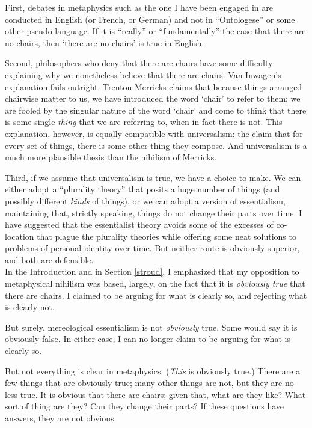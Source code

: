 \documentclass[12pt,twoside]{reedfancy}
\begin{document}
\begin{spacing}{1.25}
First, debates in metaphysics such as the one I have been engaged in
are conducted in English (or French, or German) and not in
``Ontologese'' or some other pseudo-language.  If it is ``really'' or
``fundamentally'' the case that there are no chairs, then `there are
no chairs' is true in English.

Second, philosophers who deny that there are chairs have some
difficulty explaining why we nonetheless believe that there are
chairs.  Van Inwagen's explanation fails outright.  Trenton Merricks
claims that because things arranged chairwise matter to us, we have
introduced the word `chair' to refer to them; we are fooled by the
singular nature of the word `chair' and come to think that there is
some single {\em thing} that we are referring to, when in fact there
is not.  This explanation, however, is equally compatible with
universalism: the claim that for every set of things, there is some
other thing they compose.  And universalism is a much more plausible
thesis than the nihilism of Merricks.

Third, if we assume that universalism is true, we have a choice to
make.  We can either adopt a ``plurality theory'' that posits a huge
number of things (and possibly different {\em kinds} of things), or we
can adopt a version of essentialism, maintaining that, strictly
speaking, things do not change their parts over time.  I have
suggested that the essentialist theory avoids some of the excesses of
co-location that plague the plurality theories while offering some
neat solutions to problems of personal identity over time.  But
neither route is obviously superior, and both are defensible.\\

In the Introduction and in Section \ref{stroud}, I emphasized that my
opposition to metaphysical nihilism was based, largely, on the fact
that it is {\em obviously true} that there are chairs.  I claimed to
be arguing for what is clearly so, and rejecting what is clearly not.

But surely, mereological essentialism is not {\em obviously} true.
Some would say it is obviously false.  In either case, I can no longer
claim to be arguing for what is clearly so.

But not everything is clear in metaphysics.  ({\em This} is obviously
true.)  There are a few things that are obviously true; many other
things are not, but they are no less true.  It is obvious that there
are chairs; given that, what are they like?  What sort of thing are
they?  Can they change their parts?  If these questions have answers,
they are not obvious.


\end{spacing}
\end{document}
